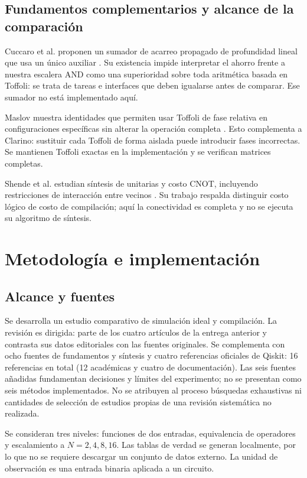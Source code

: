 \subsection{Fundamentos complementarios y alcance de la comparación}
Cuccaro et al. proponen un sumador de acarreo propagado de profundidad
lineal que usa un único auxiliar \cite{cuccaro2004}. Su existencia impide
interpretar el ahorro frente a nuestra escalera AND como una superioridad
sobre toda aritmética basada en Toffoli: se trata de tareas e interfaces
que deben igualarse antes de comparar. Ese sumador no está implementado aquí.

Maslov muestra identidades que permiten usar Toffoli de fase relativa en
configuraciones específicas sin alterar la operación completa
\cite{maslov2016}. Esto complementa a Clarino: sustituir cada Toffoli de
forma aislada puede introducir fases incorrectas. Se mantienen Toffoli
exactas en la implementación y se verifican matrices completas.

Shende et al. estudian síntesis de unitarias y costo CNOT, incluyendo
restricciones de interacción entre vecinos \cite{shende2006}. Su trabajo
respalda distinguir costo lógico de costo de compilación; aquí la
conectividad es completa y no se ejecuta su algoritmo de síntesis.

\section{Metodología e implementación}
\subsection{Alcance y fuentes}
Se desarrolla un estudio comparativo de simulación ideal y compilación.
La revisión es dirigida: parte de los cuatro artículos de la entrega anterior
y contrasta sus datos editoriales con las fuentes originales. Se complementa
con ocho fuentes de fundamentos y síntesis y cuatro referencias oficiales
de Qiskit: 16 referencias en total (12 académicas y cuatro de documentación).
Las seis fuentes añadidas fundamentan decisiones y límites del experimento;
no se presentan como seis métodos implementados.
No se atribuyen al proceso búsquedas exhaustivas ni cantidades de selección
de estudios propias de una revisión sistemática no realizada.

Se consideran tres niveles: funciones de dos entradas, equivalencia de
operadores y escalamiento a $N=2,4,8,16$. Las tablas de verdad se generan
localmente, por lo que no se requiere descargar un conjunto de datos externo.
La unidad de observación es una entrada binaria aplicada a un circuito.

